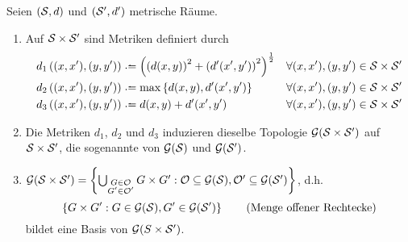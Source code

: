 \begin{satz}\label{satz: 2.10} %
	Seien $(\S,d)$ und $(\S',d')$ metrische Räume.
	\begin{enumerate}[label={(\arabic*)}]
		\item \label{it: produktmetrik} Auf $\S \times \S'$ sind Metriken definiert durch
			\begin{align*}
				d_1 \brackets{(x,x'),(y,y')}
				&\defeq \brackets{ \brackets{d(x,y)}^2 + \brackets{d'(x',y')}^2}^{\frac{1}{2}}
				&\forall(x,x'),(y,y') \in \S \times \S'\\
				d_2 \brackets{(x,x'),(y,y')}
				&\defeq \max\menge{ d(x,y),d'(x',y')}
				&\forall(x,x'),(y,y')\in \S \times \S' \\
				d_3\brackets{(x,x'),(y,y')}
				&\defeq d(x,y) + d'(x',y')
				&\forall(x,x'),(y,y') \in \S \times \S'
			\end{align*}
		\item \label{it: produkttopologie} Die Metriken $d_1$, $d_2$ und $d_3$ induzieren dieselbe Topologie $\mathcal{G}(\S \times \S')$ auf $\S\times\S'$,
			die sogenannte  von $\mathcal{G}(\S)$ und $\mathcal{G}(\S')$.
		\item \label{it: produktbasis}
			$\mathcal{G}(\S\times\S')=\menge{\bigcup_{
					\begin{subarray}{c} G\in\mathcal{O}\\ G'\in\mathcal{O}' \end{subarray}
				} G\times G': \mathcal{O}\subseteq\mathcal{G}(\S), \mathcal{O}'\subseteq\mathcal{G}(\S')
				}$, d.h.
			\begin{equation}
				\menge{ G \times G' : G \in \mathcal{G}(\S), G' \in \mathcal{G}(\S')}
				\tag{Menge offener Rechtecke}
			\end{equation}
			bildet eine Basis von $\mathcal{G}(S\times\S')$.
	\end{enumerate}
\end{satz}

